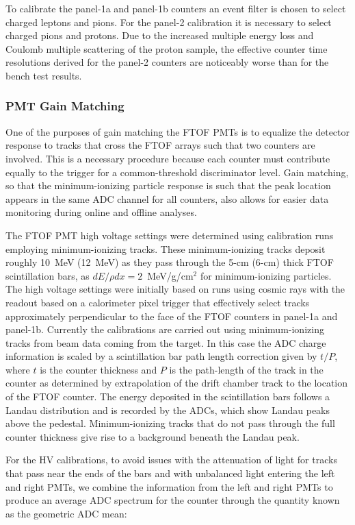 \documentclass{elsart}
\begin{document}
To calibrate the panel-1a and panel-1b counters an event filter is chosen to select charged leptons and pions.
For the panel-2 calibration it is necessary to select charged pions and protons. Due to the increased multiple
energy loss and Coulomb multiple scattering of the proton sample, the effective counter time resolutions
derived for the panel-2 counters are noticeably worse than for the bench test results.

\subsubsection{PMT Gain Matching}
\label{gain-matching}

One of the purposes of gain matching the FTOF PMTs is to equalize the detector response to tracks that
cross the FTOF arrays such that two counters are involved. This is a necessary procedure because each
counter must contribute equally to the trigger for a common-threshold discriminator level. Gain matching,
so that the minimum-ionizing particle response is such that the peak location appears in the same ADC
channel for all counters, also allows for easier data monitoring during online and offline analyses.

The FTOF PMT high voltage settings were determined using calibration runs employing minimum-ionizing
tracks. These minimum-ionizing tracks deposit roughly 10~MeV (12~MeV) as they pass through the 5-cm
(6-cm) thick FTOF scintillation bars, as $dE/\rho dx = 2$~MeV/g/cm$^2$ for minimum-ionizing particles.
The high voltage settings were initially based on runs using cosmic rays with the readout based on a
calorimeter pixel trigger that effectively select tracks approximately perpendicular to the face of the
FTOF counters in panel-1a and panel-1b. Currently the calibrations are carried out using minimum-ionizing
tracks from beam data coming from the target. In this case the ADC charge information is scaled by a
scintillation bar path length correction given by $t/P$, where $t$ is the counter thickness and $P$ is the
path-length of the track in the counter as determined by extrapolation of the drift chamber track to the
location of the FTOF counter. The energy deposited in the scintillation bars follows a Landau distribution
and is recorded by the ADCs, which show Landau peaks above the pedestal. Minimum-ionizing tracks that
do not pass through the full counter thickness give rise to a background beneath the Landau peak.

For the HV calibrations, to avoid issues with the attenuation of light for tracks that pass near the ends of
the bars and with unbalanced light entering the left and right PMTs, we combine the information from the
left and right PMTs to produce an average ADC spectrum for the counter through the quantity known
as the geometric ADC mean:
\end{document}
